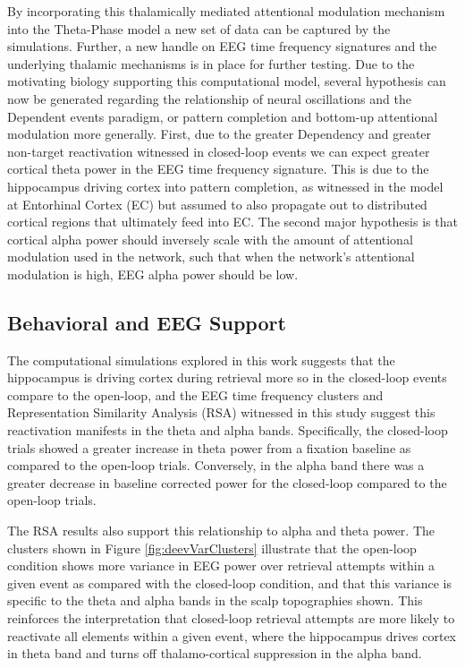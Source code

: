 \documentclass[11pt, titlepage, twoside]{article}
\begin{document}
By incorporating this thalamically mediated attentional modulation mechanism into the Theta-Phase model a new set of data can be captured by the simulations.  Further, a new handle on EEG time frequency signatures and the underlying thalamic mechanisms is in place for further testing.  Due to the motivating biology supporting this computational model, several hypothesis can now be generated regarding the relationship of neural oscillations and the Dependent events paradigm, or pattern completion and bottom-up attentional modulation more generally.  First, due to the greater Dependency and greater non-target reactivation witnessed in closed-loop events we can expect greater cortical theta power in the EEG time frequency signature.  This is due to the hippocampus driving cortex into pattern completion, as witnessed in the model at Entorhinal Cortex (EC) but assumed to also propagate out to distributed cortical regions that ultimately feed into EC.  The second major hypothesis is that cortical alpha power should inversely scale with the amount of attentional modulation used in the network, such that when the network's attentional modulation is high, EEG alpha power should be low.  

\subsection{Behavioral and EEG Support}
The computational simulations explored in this work suggests that the hippocampus is driving cortex during retrieval more so in the closed-loop events compare to the open-loop, and the EEG time frequency clusters and Representation Similarity Analysis (RSA) witnessed in this study suggest this reactivation manifests in the theta and alpha bands.   Specifically, the closed-loop trials showed a greater increase in theta power from a fixation baseline as compared to the open-loop trials.  Conversely, in the alpha band there was a greater decrease in baseline corrected power for the closed-loop compared to the open-loop trials.  

The RSA results also support this relationship to alpha and theta power.  The clusters shown in Figure \ref{fig:deevVarClusters} illustrate that the open-loop condition shows more variance in EEG power over retrieval attempts within a given event as compared with the closed-loop condition, and that this variance is specific to the theta and alpha bands in the scalp topographies shown.  This reinforces the interpretation that closed-loop retrieval attempts are more likely to reactivate all elements within a given event, where the hippocampus drives cortex in theta band and turns off thalamo-cortical suppression in the alpha band.  
\end{document}
